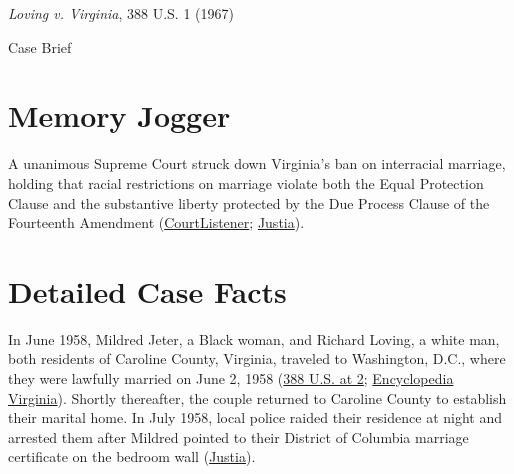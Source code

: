 \documentclass[12pt]{article}
\begin{document}
\begin{center}
{\LARGE \textit{Loving v. Virginia}, 388 U.S. 1 (1967)\par}
\vspace{0.8em}
{\large Case Brief\par}
\end{center}
\vspace{1em}

\section{Memory Jogger}
A unanimous Supreme Court struck down Virginia's ban on interracial marriage, holding that racial restrictions on marriage violate both the Equal Protection Clause and the substantive liberty protected by the Due Process Clause of the Fourteenth Amendment (\href{https://www.courtlistener.com/opinion/107480/loving-v-virginia/}{CourtListener}; \href{https://supreme.justia.com/cases/federal/us/388/1/}{Justia}).

\section{Detailed Case Facts}
In June 1958, Mildred Jeter, a Black woman, and Richard Loving, a white man, both residents of Caroline County, Virginia, traveled to Washington, D.C., where they were lawfully married on June 2, 1958 (\href{https://supreme.justia.com/cases/federal/us/388/1/}{388 U.S. at 2}; \href{https://encyclopediavirginia.org/entries/loving-v-virginia-1967/}{Encyclopedia Virginia}). Shortly thereafter, the couple returned to Caroline County to establish their marital home. In July 1958, local police raided their residence at night and arrested them after Mildred pointed to their District of Columbia marriage certificate on the bedroom wall (\href{https://supreme.justia.com/cases/federal/us/388/1/}{Justia}).
\end{document}
